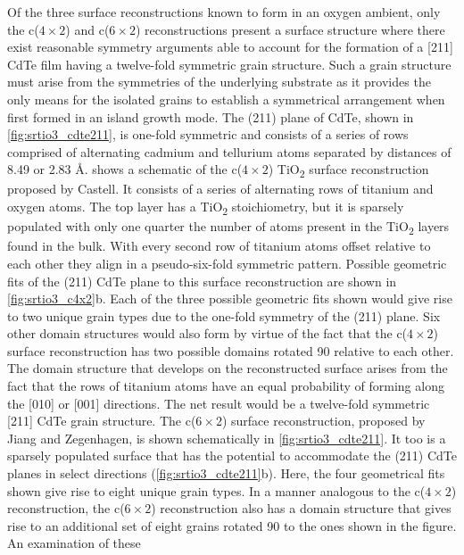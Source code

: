 Of the three surface reconstructions known to form in an
oxygen ambient, only the c($4\times2$) and c($6\times2$) reconstructions
present a surface structure where there exist reasonable symmetry
arguments able to account for the formation of a [211] CdTe film
having a twelve-fold symmetric grain structure. Such a grain
structure must arise from the symmetries of the underlying
substrate as it provides the only means for the isolated grains to
establish a symmetrical arrangement when first formed in an
island growth mode. The (211) plane of CdTe, shown in \cref{fig:srtio3_cdte211}, is
one-fold symmetric and consists of a series of rows comprised of
alternating cadmium and tellurium atoms separated by distances of 8.49 or 2.83 \AA.  shows a schematic of the c($4\times2$) TiO\textsubscript{2} surface reconstruction proposed by Castell\cite{Castell2002}. It consists of a
series of alternating rows of titanium and oxygen atoms. The top
layer has a TiO\textsubscript{2} stoichiometry, but it is sparsely populated with
only one quarter the number of atoms present in the TiO\textsubscript{2} layers
found in the bulk\cite{Castell2002}. With every second row of titanium atoms
offset relative to each other they align in a pseudo-six-fold
symmetric pattern. Possible geometric fits of the (211) CdTe plane
to this surface reconstruction are shown in \cref{fig:srtio3_c4x2}b. Each of the three
possible geometric fits shown would give rise to two unique grain
types due to the one-fold symmetry of the (211) plane. Six other
domain structures would also form by virtue of the fact that the
c($4\times2$) surface reconstruction has two possible domains rotated
90\degree{} relative to each other\cite{Castell2002}. The domain structure that develops
on the reconstructed surface arises from the fact that the rows of
titanium atoms have an equal probability of forming along the
[010] or [001] directions. The net result would be a twelve-fold
symmetric [211] CdTe grain structure. The c($6\times2$) surface
reconstruction, proposed by Jiang and Zegenhagen\cite{Jiang1996}, is shown
schematically in \cref{fig:srtio3_cdte211}. It too is a sparsely populated surface that
has the potential to accommodate the (211) CdTe planes in select
directions (\cref{fig:srtio3_cdte211}b). Here, the four geometrical fits shown give rise
to eight unique grain types. In a manner analogous to the c($4\times2$)
reconstruction, the c($6\times2$) reconstruction also has a domain
structure that gives rise to an additional set of eight grains rotated
90\degree{} to the ones shown in the figure. An examination of these
